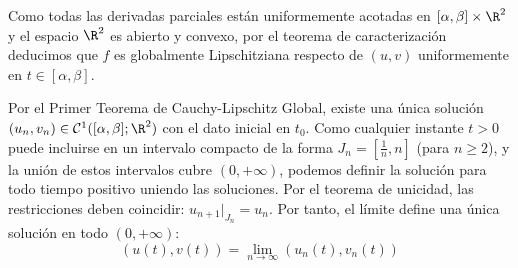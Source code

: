 {    Como todas las derivadas parciales están uniformemente acotadas en $[\alpha, \beta] \times \R^2$ y el espacio $\R^2$ es abierto y convexo, por el teorema de caracterización deducimos que $f$ es globalmente Lipschitziana respecto de $(u,v)$ uniformemente en $t \in [\alpha, \beta]$.

    Por el Primer Teorema de Cauchy-Lipschitz Global, existe una única solución $(u_n, v_n) \in \mathcal{C}^1([\alpha, \beta]; \R^2)$ con el dato inicial en $t_0$. Como cualquier instante $t > 0$ puede incluirse en un intervalo compacto de la forma $J_n = \left[ \frac{1}{n}, n \right]$ (para $n \ge 2$), y la unión de estos intervalos cubre $(0, +\infty)$, podemos definir la solución para todo tiempo positivo uniendo las soluciones. Por el teorema de unicidad, las restricciones deben coincidir: $u_{n+1}|_{J_n} = u_n$. Por tanto, el límite define una única solución en todo $(0, +\infty)$:
    \[
        (u(t), v(t)) = \lim_{n \to \infty} (u_n(t), v_n(t))
    \]
}

